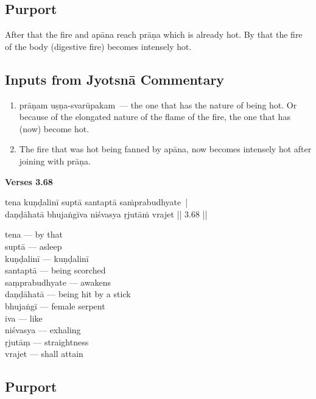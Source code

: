 \subsection*{Purport}

After that the fire and apāna reach prāṇa which is already hot. By that the fire of the body (digestive fire) becomes intensely hot. 

\subsection*{Inputs from Jyotsnā Commentary}

\begin{enumerate}
\item prāṇam uṣṇa-svarūpakam --- the one that has the nature of being hot. Or because of the elongated nature of the flame of the fire, the one that has (now) become hot. 
\item The fire that was hot being fanned by apāna, now becomes intensely hot after joining with prāṇa. 
\end{enumerate}


\noindent \textbf{Verses 3.68}

\begin{shloka}
tena kuṇḍalinī suptā santaptā saṁprabudhyate |\\
daṇḍāhatā bhujaṅgīva niśvasya ṛjutāṁ vrajet || 3.68 ||
\end{shloka}

\begin{multicols}{2}
tena --- by that \\
suptā --- asleep \\
kuṇḍalinī --- kuṇḍalinī    \\
santaptā --- being scorched \\
saṃprabudhyate ---  awakens \\
daṇḍāhatā --- being hit by a stick \\
bhujaṅgī --- female serpent \\
iva --- like \\
niśvasya ---  exhaling \\
ṛjutāṃ --- straightness \\
vrajet --- shall attain  
\end{multicols}

\subsection*{Purport}

